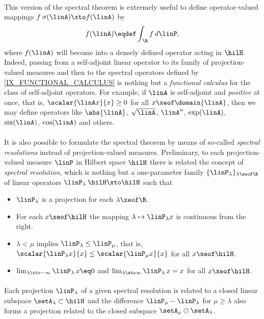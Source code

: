 \documentclass[11pt,twoside]{article}
\begin{document}
\paragraph{} %
This version of the spectral theorem is extremely useful
to define operator-valued mappings $f\:\sigma(\linA) \xto f(\linA)$ by
\[
f(\linA) \eqdef \int_{\,\R} f \, d\linP,
\]
where $f(\linA)$ will become into a densely defined operator
acting in $\hilH$.
Indeed,
passing from a self-adjoint linear operator
to its family of projection-valued measures
and then to the spectral operators defined by \eqref{IX_FUNCTIONAL_CALCULUS}
is nothing but a \textit{functional calculus}
for the class of self-adjoint operators.
For example, 
if $\linA$ is self-adjoint and \textit{positive} at once,
that is,
$\scalar{\linA x}{x} \geq 0$ for all $x \xeof \domain{\linA}$,
then we may define operators like
$\abs{\linA} $,
$\sqrt{\linA}$, 
$\linA^n$,
$\exp(\linA)$,
$\sin(\linA)$,
$\cos(\linA)$ and others.

\paragraph{} %
It is also possible to formulate the spectral theorem by means of so-called
\textit{spectral resolutions} instead of projection-valued measures.
Preliminary,
to each projection-valued measure $\linP$ in Hilbert space $\hilH$
there is related the concept of \textit{spectral resolution},
which is nothing but a one-parameter family
$\{\linP_{\lambda}\}_{\lambda \xeof \R}$
of linear operators $\linP_{\lambda}\:\hilH \xto \hilH$
such that

\begin{itemize}[leftmargin=22mm]
\item[(R-1)]
$\linP_{\lambda}$ is a projection for each $\lambda \xeof \R$.
\item[(R-2)]
For each $x \xeof \hilH$
the mapping $\lambda \mapsto \linP_{\lambda} x$ is continuous from the right.
\item[(R-3)]
$\lambda < \mu$ implies $\linP_{\lambda} \leq \linP_{\mu}$,
that is,
$\scalar{\linP_{\lambda} x}{x} \leq \scalar{\linP_{\mu} x}{x}$
for all $x \xeof \hilH$.
\item[(R-4)]
$\lim_{\lambda \xto -\infty} \linP_{\lambda} \, x \eq 0$
and
$\lim_{\lambda \xto  \infty} \linP_{\lambda}  \, x= x$
for all $x \xeof \hilH$.
\end{itemize}

\paragraph{}
Each projection $\linP_{\lambda}$ of a given spectral resolution
is related to a closed linear subspace $\setA_{\lambda} \subset \hilH$
and the difference $\linP_{\mu} - \linP_{\lambda}$
for $\mu \geq \lambda$ also forms a projection related to the closed subspace
$\setA_{\mu} \ominus \setA_{\lambda}$.
\end{document}
